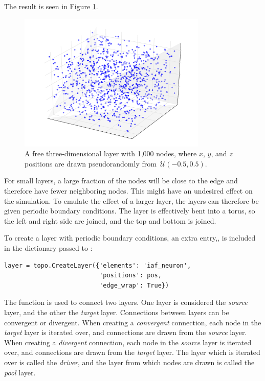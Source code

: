 The result is seen in Figure \ref{fig:free_3D_layer}.
\begin{figure}[h]
  \centering
  \includegraphics[width=0.8\textwidth]{TopologyExample3D.pdf}
  \caption[Example of free three-dimensional layer]{A free three-dimensional layer with 1,000 nodes, where $x$, $y$, and $z$ positions are drawn pseudorandomly from~$\mathcal{U}(-0.5, 0.5)$.}
  \label{fig:free_3D_layer}
\end{figure}

For small layers, a large fraction of the nodes will be close to the edge and therefore have fewer neighboring nodes. This might have an undesired effect on the simulation. To emulate the effect of a larger layer, the layers can therefore be given periodic boundary conditions. The layer is effectively bent into a torus, so the left and right side are joined, and the top and bottom is joined. 

To create a layer with periodic boundary conditions, an extra entry,\linebreak {}, is included in the dictionary passed to :
\begin{lstlisting}
layer = topo.CreateLayer({'elements': 'iaf_neuron', 
                          'positions': pos,
                          'edge_wrap': True})
\end{lstlisting}

The  function is used to connect two layers. One layer is considered the \emph{source} layer, and the other the \emph{target} layer. Connections between layers can be convergent or divergent. When creating a \emph{convergent} connection, each node in the \emph{target} layer is iterated over, and connections are drawn from the \emph{source} layer. When creating a \emph{divergent} connection, each node in the \emph{source} layer is iterated over, and connections are drawn from the \emph{target} layer. The layer which is iterated over is called the \emph{driver}, and the layer from which nodes are drawn is called the \emph{pool} layer. 

